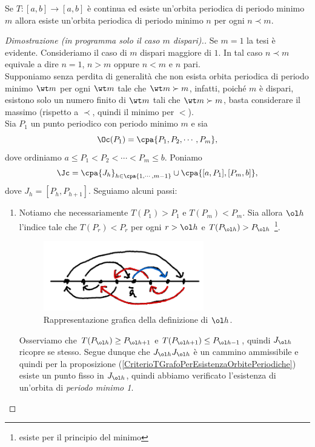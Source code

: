 \begin{theorem}[Sharkovsky]\label{TeoremaSharkovsky}
Se $T:[a,b]\to [a,b]$ \`e continua ed esiste un'orbita periodica di periodo minimo $m$ allora esiste un'orbita periodica di periodo minimo $n$ per ogni $n\prec m$.
\end{theorem}
\begin{proof}[Dimostrazione (in programma solo il caso $m$ dispari).]
Se $m=1$ la tesi \`e evidente. Consideriamo il caso di $m$ dispari maggiore di $1$. In tal caso $n\prec m$ equivale a dire $n=1$, $n>m$ oppure $n<m$ e $n$ pari.\\
Supponiamo senza perdita di generalit\`a che non esista orbita periodica di periodo minimo $\wt m$ per ogni $\wt m$ tale che $\wt m\succ m$, infatti, poich\'e $m$ \`e dispari, esistono solo un numero finito di $\wt m$ tali che $\wt m\succ m$, basta considerare il massimo (rispetto a $\prec$, quindi il minimo per $<$).\\
Sia $P_1$ un punto periodico con periodo minimo $m$ e sia
\[\Oc(P_1)=\cpa{P_1,P_2,\cdots, P_m},\]
dove ordiniamo $a \leq P_1 < P_2 < \cdots < P_m \leq b$. Poniamo
\[\Jc=\cpa{J_h}_{h\in\cpa{1,\cdots, m-1}}\cup \cpa{[a,P_1], [P_m,b]},\]
dove $J_h=[P_h,P_{h+1}]$. Seguiamo alcuni passi:
\setlength{\leftmargini}{0cm}
\begin{enumerate}
\item Notiamo che necessariamente $T(P_1)>P_1$ e $T(P_m)<P_m$. Sia allora $\ol h$ l'indice tale che $T(P_r)<P_r$ per ogni $r>\ol h$ e $T(P_{\ol h})>P_{\ol h}$ \footnote{esiste per il principio del minimo}. 

\begin{figure}[!htb]
	\centering
	\includegraphics[width=7cm]{Immagini/Definizione_hbarra.png}
	\caption{Rappresentazione grafica della definizione di $\ol h$.}
\end{figure}

Osserviamo che $T(P_{\ol h})\geq P_{\ol h+1}$ e $T(P_{\ol h+1})\leq P_{\ol h-1}$, quindi $J_{\ol h}$ ricopre se stesso. Segue dunque che $J_{\ol h}J_{\ol h}$ \`e un cammino ammissibile e quindi per la proposizione (\ref{CriterioTGrafoPerEsistenzaOrbitePeriodiche}) esiste un punto fisso in $J_{\ol h}$, quindi abbiamo verificato l'esistenza di un'orbita di \textit{periodo minimo 1}.


\end{enumerate}
\end{proof}
